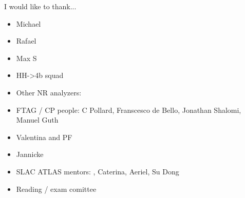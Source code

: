 
I would like to thank...

\begin{itemize}
	\item Michael
	\item Rafael
	\item Max S
	\item HH->4b squad 
	\item Other NR analyzers:
	\item FTAG / CP people: C Pollard, Franscesco de Bello, Jonathan Shalomi, Manuel Guth
	\item Valentina and PF
	\item Jannicke
	\item SLAC ATLAS mentors: , Caterina, Aeriel, Su Dong
	\item Reading / exam comittee
\end{itemize}
